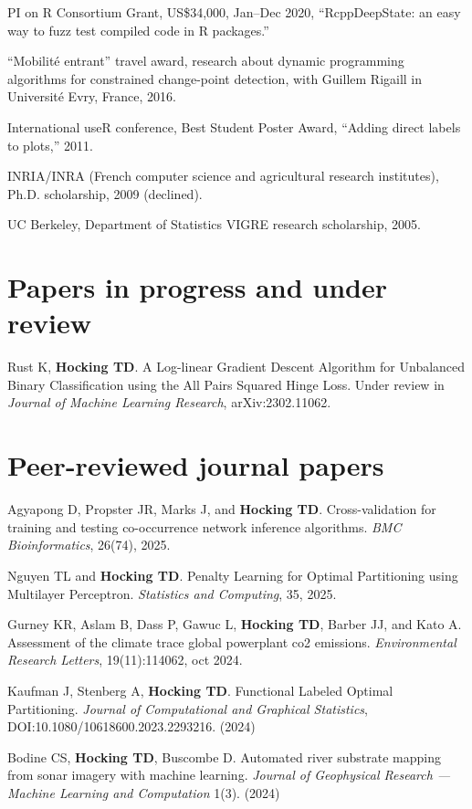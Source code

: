 \documentclass[margin,line]{res}
\begin{document}
\begin{resume}
PI on R Consortium Grant, US\$34,000, Jan--Dec 2020, ``RcppDeepState: an easy
way to fuzz test compiled code in R packages.''

``Mobilit\'e entrant'' travel award, research about dynamic
programming algorithms for constrained change-point detection, with
Guillem Rigaill in Universit\'e Evry, France, 2016.

International useR conference, Best Student Poster Award, ``Adding
direct labels to plots,'' 2011.

INRIA/INRA (French computer science and agricultural research institutes), Ph.D. scholarship, 2009 (declined).

UC Berkeley, Department of Statistics VIGRE research scholarship, 2005.

\section{\sc Papers in progress and under review}

Rust K, {\bf Hocking TD}. A Log-linear Gradient Descent Algorithm for
Unbalanced Binary Classification using the All Pairs Squared Hinge
Loss. Under review in {\it Journal of Machine Learning Research},
arXiv:2302.11062.

\section{\sc Peer-reviewed journal papers}

Agyapong D, Propster JR, Marks J, and {\bf Hocking TD}. Cross-validation for training and testing co-occurrence network inference algorithms. {\it BMC Bioinformatics}, 26(74), 2025.

Nguyen TL and {\bf Hocking TD}. Penalty Learning for Optimal Partitioning using Multilayer Perceptron. {\it Statistics and Computing}, 35, 2025.

Gurney KR, Aslam B, Dass P, Gawuc L, {\bf Hocking TD}, Barber JJ, and Kato A. Assessment of the climate trace global powerplant co2 emissions. {\it Environmental Research Letters}, 19(11):114062, oct 2024.

Kaufman J, Stenberg A, {\bf Hocking TD}. Functional Labeled Optimal
Partitioning. {\it Journal of Computational and Graphical Statistics},
DOI:10.1080/10618600.2023.2293216. (2024)

Bodine CS, {\bf Hocking TD}, Buscombe D. Automated river substrate
mapping from sonar imagery with machine learning.  {\it
  Journal of Geophysical Research --- Machine Learning and
  Computation} 1(3). (2024)


\end{resume}
\end{document}
